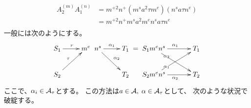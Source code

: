 {	\begin{todo}[ここまで]\label{todo:ここまで} %
	\end{todo} %
	\begin{equation*}\begin{split}
		A_2^{(m)}A_1^{(n)} &= m^{+2}n^{+} (m^sa^2\tau m^e)(n^sa\tau n^e) \\
		&= m^{+2}n^{+} m^sa^2m^en^sa\tau n^e \\
	\end{split}\end{equation*}
	一般には次のようにする。
	\begin{equation*}\begin{split}
		\xymatrix {
			S_1 \ar[r]^\tau & m^e \\
			S_2 \ar[ru]^\tau \\
		} \xymatrix {
			n^s \ar[r]^{\alpha_1} \ar[rd]^{\alpha_2} & T_1 \\
			& T_2 \\
		} = \xymatrix @C+1em {
			S_1m^en^s \ar[r]^{\alpha_1} \ar[rd]|(0.3){\alpha_2} & T_1 \\
			S_2m^en^s \ar[r]_{\alpha_2} \ar[ru]|(0.3){\alpha_1} & T_2 \\
		}
	\end{split}\end{equation*}
	ここで、$\alpha_i\in{\ensuremath{{\mathcal{A}}}}_\tau$とする。
	この方法は$a\in{\ensuremath{{\mathcal{A}}}},\;\alpha\in{\ensuremath{{\mathcal{A}}}}_\tau$として、
	次のような状況で破綻する。

}
